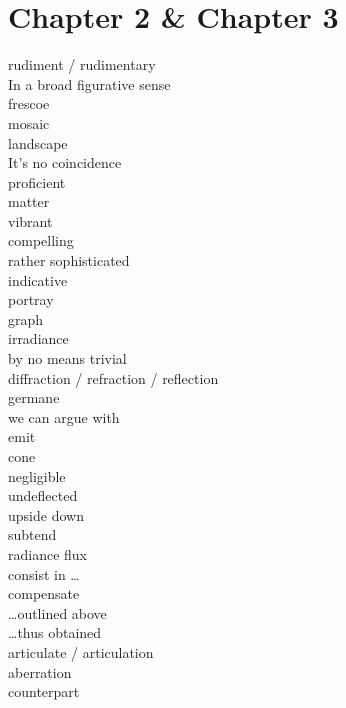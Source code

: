 \documentclass[12pt]{article}
\begin{document}
\section{Chapter 2 \& Chapter 3}
rudiment / rudimentary \\
In a broad figurative sense \\
frescoe \\
mosaic \\
landscape \\
It's no coincidence \\
proficient \\
matter  \\
vibrant \\
compelling \\
rather sophisticated  \\
indicative  \\
portray \\
graph \\
irradiance \\
by no means trivial \\
diffraction / refraction / reflection \\
germane \\
we can argue with  \\
emit  \\
cone  \\
negligible \\
undeflected \\
upside down \\
subtend \\
radiance flux \\
consist in \dots  \\
compensate  \\
\dots outlined above  \\
\dots thus obtained  \\
articulate / articulation \\
aberration \\
counterpart \\
\end{document}
